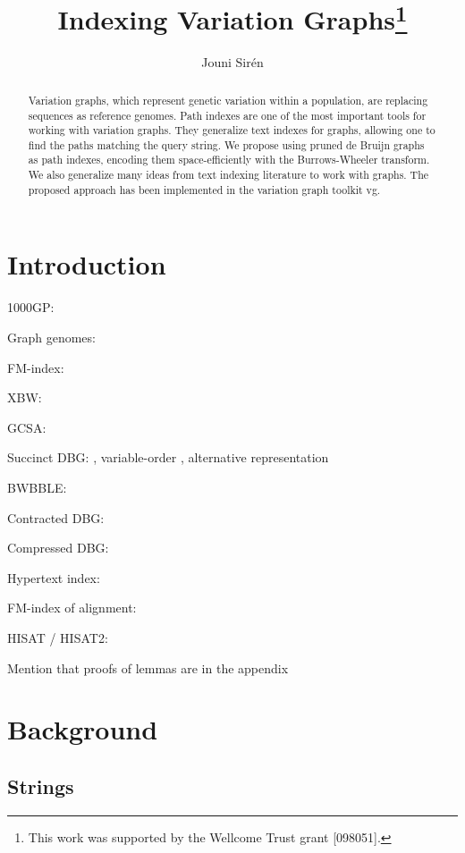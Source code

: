 \documentclass[a4paper,UKenglish]{lipics-v2016}
\title{Indexing Variation Graphs\footnote{This work was supported by the Wellcome Trust grant [098051].}}
\author[1]{Jouni Sirén}
\affil[1]{Wellcome Trust Sanger Institute, Hinxton, Cambridge, UK\\
  \texttt{jouni.siren@iki.fi}}
\begin{document}
\maketitle

\begin{abstract}
Variation graphs, which represent genetic variation within a population, are replacing sequences as reference genomes. Path indexes are one of the most important tools for working with variation graphs. They generalize text indexes for graphs, allowing one to find the paths matching the query string. We propose using pruned de Bruijn graphs as path indexes, encoding them space-efficiently with the Burrows-Wheeler transform. We also generalize many ideas from text indexing literature to work with graphs. The proposed approach has been implemented in the variation graph toolkit vg.
\end{abstract}


\section{Introduction}

1000GP: \cite{1000GP2015}

Graph genomes: \cite{Schneeberger2009}

FM-index: \cite{Ferragina2005a}

XBW: \cite{Ferragina2009b}

GCSA: \cite{Siren2014}

Succinct DBG: \cite{Bowe2012}, variable-order \cite{Boucher2014}, alternative representation \cite{Roedland2013}

BWBBLE: \cite{Huang2013}

Contracted DBG: \cite{Cazaux2014}

Compressed DBG: \cite{Marcus2014}

Hypertext index: \cite{Thachuk2013}

FM-index of alignment: \cite{Na2015}

HISAT / HISAT2: \cite{Kim2015}

Mention that proofs of lemmas are in the appendix


\section{Background}

\subsection{Strings}\label{sect:strings}
\end{document}
